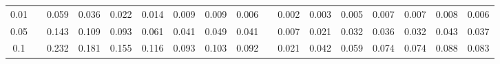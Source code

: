 % 
\begin{tabular}{ccccccccccccccccc}
  \hline
  \hline
0.01 &  & 0.059 & 0.036 & 0.022 & 0.014 & 0.009 & 0.009 & 0.006 &  & 0.002 & 0.003 & 0.005 & 0.007 & 0.007 & 0.008 & 0.006 \\ 
  0.05 &  & 0.143 & 0.109 & 0.093 & 0.061 & 0.041 & 0.049 & 0.041 &  & 0.007 & 0.021 & 0.032 & 0.036 & 0.032 & 0.043 & 0.037 \\ 
  0.1 &  & 0.232 & 0.181 & 0.155 & 0.116 & 0.093 & 0.103 & 0.092 &  & 0.021 & 0.042 & 0.059 & 0.074 & 0.074 & 0.088 & 0.083 \\ 
   \hline
\end{tabular}
